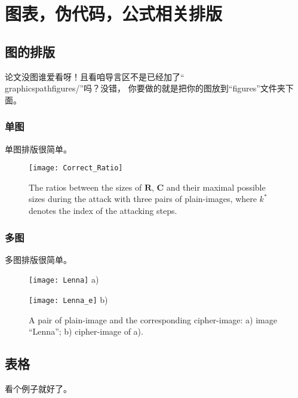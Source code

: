 \chapter{图表，伪代码，公式相关排版}\label{elements}

\section{图的排版}
论文没图谁爱看呀！且看咱导言区不是已经加了``\\graphicspath{{figures/}}''吗？没错，
你要做的就是把你的图放到``figures''文件夹下面。

\subsection{单图}
单图排版很简单。

\begin{figure}[!htb]
\centering
\begin{minipage}[t]{\oneimage}
\centering
\texttt{[image: Correct\_Ratio]}
\end{minipage}
\caption{The ratios between the sizes of $\bm{R}$, $\bm{C}$ and their maximal possible sizes during the attack with three pairs of plain-images,
where $k^*$ denotes the index of the attacking steps.}
\label{fig:ratio}
\end{figure}

\subsection{多图}
多图排版很简单。

\begin{figure}[!htb]
\centering
\begin{minipage}[t]{\twoimage}
\centering
\texttt{[image: Lenna]}
a)
\end{minipage} \hspace{4pt}
\begin{minipage}[t]{\twoimage}
\centering
\texttt{[image: Lenna\_e]}
b)
\end{minipage}
\caption{A pair of plain-image and the corresponding cipher-image:
a) image ``Lenna''; b) cipher-image of a).}
\label{fig:APairPlaintext}
\end{figure}

\section{表格}
看个例子就好了。

